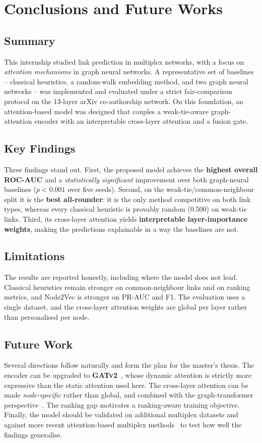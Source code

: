 \chapter{Conclusions and Future Works}
\label{ch:conclusion}

\section{Summary}
This internship studied link prediction in multiplex networks, with a focus on \emph{attention
mechanisms} in graph neural networks. A representative set of baselines -- classical heuristics, a
random-walk embedding method, and two graph neural networks -- was implemented and evaluated under a
strict fair-comparison protocol on the 13-layer arXiv co-authorship network. On this foundation, an
attention-based model was designed that couples a weak-tie-aware graph-attention encoder with an
interpretable cross-layer attention and a fusion gate.

\section{Key Findings}
Three findings stand out. First, the proposed model achieves the \textbf{highest overall ROC-AUC} and
a \emph{statistically significant} improvement over both graph-neural baselines ($p<0.001$ over five
seeds). Second, on the weak-tie/common-neighbour split it is the \textbf{best all-rounder}: it is the
only method competitive on both link types, whereas every classical heuristic is provably random
(0.500) on weak-tie links. Third, its cross-layer attention yields \textbf{interpretable
layer-importance weights}, making the predictions explainable in a way the baselines are not.

\section{Limitations}
The results are reported honestly, including where the model does not lead. Classical heuristics
remain stronger on common-neighbour links and on ranking metrics, and Node2Vec is stronger on PR-AUC
and F1. The evaluation uses a single dataset, and the cross-layer attention weights are global per
layer rather than personalised per node.

\section{Future Work}
Several directions follow naturally and form the plan for the master's thesis. The encoder can be
upgraded to \textbf{GATv2}~\cite{gatv2}, whose dynamic attention is strictly more expressive than the
static attention used here. The cross-layer attention can be made \emph{node-specific} rather than
global, and combined with the graph-transformer perspective~\cite{gtsurvey2024}. The ranking gap
motivates a ranking-aware training objective. Finally, the model should be validated on additional
multiplex datasets and against more recent attention-based multiplex
methods~\cite{gao2023,multiplexsage2024} to test how well the findings generalise.
